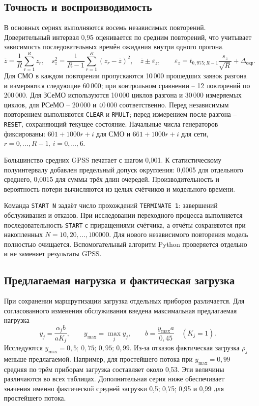 \documentclass[12pt,a4paper]{article}
\begin{document}
\subsection{Точность и воспроизводимость}
В основных сериях выполняются восемь независимых повторений. Доверительный интервал 0,95 оценивается по средним повторений, что учитывает зависимость последовательных времён ожидания внутри одного прогона.
\begin{equation}
\overline z=\frac1R\sum_{r=1}^Rz_r,\quad
s_z^2=\frac1{R-1}\sum_{r=1}^R(z_r-\overline z)^2,\quad
\overline z\pm\varepsilon_z,\qquad
\varepsilon_z=t_{0{,}975;R-1}\frac{s_z}{\sqrt R}+\Delta_{\text{окр}}.
\end{equation}
Для СМО в каждом повторении пропускаются 10\,000 прошедших заявок разгона и измеряются следующие 60\,000; при контрольном сравнении -- 12 повторений по 200\,000. Для ЗСеМО используются 10\,000 циклов разгона и 30\,000 измеряемых циклов, для РСеМО -- 20\,000 и 40\,000 соответственно. Перед независимым повторением выполняются \texttt{CLEAR} и \texttt{RMULT}; перед измерением после разгона -- \texttt{RESET}, сохраняющий текущее состояние. Начальные числа генераторов фиксированы: \(601+1000r+i\) для СМО и \(661+1000r+i\) для сети, \(r=0,\ldots,R-1\), \(i=0,\ldots,6\).

Большинство средних GPSS печатает с шагом 0,001. К статистическому полуинтервалу добавлен предельный допуск округления: 0,0005 для отдельного среднего, 0,0015 для суммы трёх длин очередей. Производительность и вероятность потери вычисляются из целых счётчиков и модельного времени.

Команда \texttt{START N} задаёт число прохождений \texttt{TERMINATE 1}: завершений обслуживания и отказов. При исследовании переходного процесса выполняется последовательность \texttt{START} с приращениями счётчика, а отчёты сохраняются при накопленных \(N=10,20,\ldots,100000\). Для нового независимого повторения модель полностью очищается. Вспомогательный алгоритм Python проверяется отдельно и не заменяет результаты GPSS.

\subsection{Предлагаемая нагрузка и фактическая загрузка}
При сохранении маршрутизации загрузка отдельных приборов различается. Для согласованного изменения обслуживания введена максимальная предлагаемая нагрузка
\begin{equation}
y_j=\frac{\alpha_j b}{aK_j},\qquad y_{\max}=\max_jy_j,
\qquad b=\frac{y_{\max}a}{0{,}45}\quad(K_j=1).
\end{equation}
Исследуются \(y_{\max}=0{,}5;\,0{,}75;\,0{,}95;\,0{,}99\). Из-за отказов фактическая загрузка \(\rho_j\) меньше предлагаемой. Например, для простейшего потока при \(y_{\max}=0{,}99\) средняя по трём приборам загрузка составляет около 0,53. Эти величины различаются во всех таблицах. Дополнительная серия ниже обеспечивает значения именно фактической средней загрузки 0,5; 0,75; 0,95 и 0,99 для простейшего потока.
\end{document}
